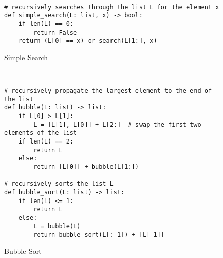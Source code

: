 \begin{definition}
    ~

\begin{center}
\begin{minipage}{.5\linewidth}
\begin{figure}[H]
\renewcommand\figurename{Algorithm}
\begin{verbatim}
# recursively searches through the list L for the element x
def simple_search(L: list, x) -> bool:
    if len(L) == 0:
        return False
    return (L[0] == x) or search(L[1:], x)
\end{verbatim}
\caption{Simple Search}\label{alg:simplesearch}
\end{figure}
\end{minipage}
\end{center}

\end{definition}

\begin{definition}
    ~

\begin{center}
\begin{minipage}{.5\linewidth}
\begin{figure}[H]
\renewcommand\figurename{Algorithm}
\begin{verbatim}
# recursively propagate the largest element to the end of the list
def bubble(L: list) -> list:
    if L[0] > L[1]:
        L = [L[1], L[0]] + L[2:]  # swap the first two elements of the list
    if len(L) == 2:
        return L
    else:
        return [L[0]] + bubble(L[1:])

# recursively sorts the list L
def bubble_sort(L: list) -> list:
    if len(L) <= 1:
        return L
    else:
        L = bubble(L)
        return bubble_sort(L[:-1]) + [L[-1]]
\end{verbatim}
\caption{Bubble Sort}\label{alg:bubblesort}
\end{figure}
\end{minipage}
\end{center}

\end{definition}

